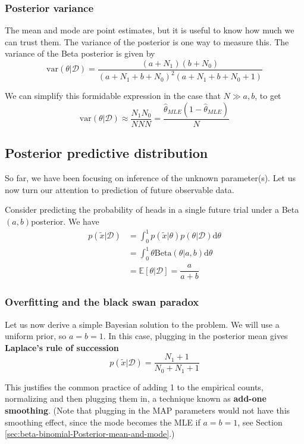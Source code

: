 \subsubsection{Posterior variance}
The mean and mode are point estimates, but it is useful to know how much we can trust them. The variance of the posterior is one way to measure this. The variance of the Beta posterior is given by
\begin{equation}
\text{var}(\theta|\mathcal{D})=\dfrac{(a+N_1)(b+N_0)}{(a+N_1+b+N_0)^2(a+N_1+b+N_0+1)}
\end{equation}

We can simplify this formidable expression in the case that $N \gg a, b$, to get
\begin{equation}
\text{var}(\theta|\mathcal{D}) \approx \dfrac{N_1N_0}{NNN}=\dfrac{\hat{\theta}_{MLE}(1-\hat{\theta}_{MLE})}{N}
\end{equation}


\subsection{Posterior predictive distribution}
So far, we have been focusing on inference of the unknown parameter(s). Let us now turn our attention to prediction of future observable data.

Consider predicting the probability of heads in a single future trial under a Beta$(a, b)$posterior. We have
\begin{align}
p(\tilde{x}|\mathcal{D})& =\int_0^1 p(\tilde{x}|\theta)p(\theta|\mathcal{D})\mathrm{d}\theta \nonumber \\
                        & =\int_0^1 \theta\text{Beta}(\theta|a,b)\mathrm{d}\theta \nonumber \\
						& =\mathbb{E}[\theta|\mathcal{D}]=\dfrac{a}{a+b}
\end{align}

\subsubsection{Overfitting and the black swan paradox}
Let us now derive a simple Bayesian solution to the problem. We will use a uniform prior, so $a=b=1$. In this case, plugging in the posterior mean gives \textbf{Laplace’s rule of succession}
\begin{equation}
p(\tilde{x}|\mathcal{D})=\dfrac{N_1+1}{N_0+N_1+1}
\end{equation}

This justifies the common practice of adding 1 to the empirical counts, normalizing and then plugging them in, a technique known as \textbf{add-one smoothing}. (Note that plugging in the MAP parameters would not have this smoothing effect, since the mode becomes the MLE if $a=b=1$, see Section \ref{sec:beta-binomial-Posterior-mean-and-mode}.)

